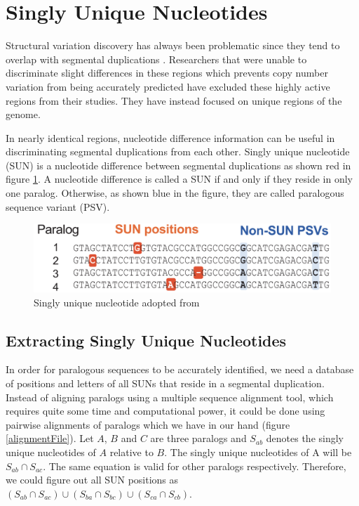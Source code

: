 \section{Singly Unique Nucleotides} \label{section:sun}
Structural variation discovery has always been problematic since they tend to overlap with segmental duplications \cite{sudmant2010diversity}. Researchers that were unable to discriminate slight differences in these regions which prevents copy number variation from being accurately predicted have excluded these highly active regions from their studies. They have instead focused on unique regions of the genome.

In nearly identical regions, nucleotide difference information can be useful in discriminating segmental duplications from each other. Singly unique nucleotide (SUN) is a nucleotide difference between segmental duplications as shown red in figure \ref{singlyUniqueNucleotide}. A nucleotide difference is called a SUN if and only if they reside in only one paralog. Otherwise, as shown blue in the figure, they are called  paralogous sequence variant (PSV). 
\begin{figure}[ht]
    \centering
    \includegraphics[scale=0.4]{images/singlyUniqueNucleotide.png}
    \caption{Singly unique nucleotide adopted from \cite{sudmant2010diversity}}
    \label{singlyUniqueNucleotide}
    \end{figure}

\subsection{Extracting Singly Unique Nucleotides}
In order for paralogous sequences to be accurately identified, we need a database of positions and letters of all SUNs that reside in a segmental duplication. Instead of aligning paralogs using a multiple sequence alignment tool, which requires quite some time and computational power, it could be done using pairwise alignments of paralogs which we have in our hand (figure \ref{alignmentFile}). Let $A$, $B$ and $C$ are three paralogs and  $S_{ab}$ denotes the singly unique nucleotides of $A$ relative to $B$. The singly unique nucleotides of A will be $S_{ab} \cap S_{ac}$. The same equation is valid for other paralogs respectively. Therefore, we could figure out all SUN positions as $(S_{ab} \cap S_{ac}) \cup (S_{ba} \cap S_{bc}) \cup (S_{ca} \cap S_{cb})$.

